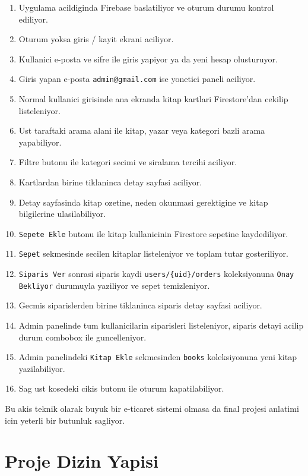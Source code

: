 \documentclass[12pt,a4paper]{article}
\begin{document}
\begin{enumerate}
  \item Uygulama acildiginda Firebase baslatiliyor ve oturum durumu kontrol ediliyor.
  \item Oturum yoksa giris / kayit ekrani aciliyor.
  \item Kullanici e-posta ve sifre ile giris yapiyor ya da yeni hesap olusturuyor.
  \item Giris yapan e-posta \verb|admin@gmail.com| ise yonetici paneli aciliyor.
  \item Normal kullanici girisinde ana ekranda kitap kartlari Firestore'dan cekilip listeleniyor.
  \item Ust taraftaki arama alani ile kitap, yazar veya kategori bazli arama yapabiliyor.
  \item Filtre butonu ile kategori secimi ve siralama tercihi aciliyor.
  \item Kartlardan birine tiklaninca detay sayfasi aciliyor.
  \item Detay sayfasinda kitap ozetine, neden okunmasi gerektigine ve kitap bilgilerine ulasilabiliyor.
  \item \verb|Sepete Ekle| butonu ile kitap kullanicinin Firestore sepetine kaydediliyor.
  \item \verb|Sepet| sekmesinde secilen kitaplar listeleniyor ve toplam tutar gosteriliyor.
  \item \verb|Siparis Ver| sonrasi siparis kaydi \verb|users/{uid}/orders| koleksiyonuna \verb|Onay Bekliyor| durumuyla yaziliyor ve sepet temizleniyor.
  \item Gecmis siparislerden birine tiklaninca siparis detay sayfasi aciliyor.
  \item Admin panelinde tum kullanicilarin siparisleri listeleniyor, siparis detayi acilip durum combobox ile guncelleniyor.
  \item Admin panelindeki \verb|Kitap Ekle| sekmesinden \verb|books| koleksiyonuna yeni kitap yazilabiliyor.
  \item Sag ust kosedeki cikis butonu ile oturum kapatilabiliyor.
\end{enumerate}

Bu akis teknik olarak buyuk bir e-ticaret sistemi olmasa da final projesi anlatimi icin yeterli bir butunluk sagliyor.

\section{Proje Dizin Yapisi}
\end{document}

